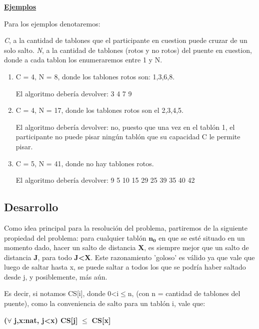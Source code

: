 \documentclass[10pt,a4paper]{article}
\begin{document}
\noindent \underline{\textbf{Ejemplos}}

\noindent Para los ejemplos denotaremos:

\textit{C}, a la cantidad de tablones que el participante en cuestion puede cruzar de un solo salto.\newline
\indent \textit{N}, a la cantidad de tablones (rotos y no rotos) del puente en cuestion, donde a cada tablon los enumeraremos entre 1 y N.

\begin{enumerate}[leftmargin=0.5cm]

\item C = 4, N = 8, donde los tablones rotos son: 1,3,6,8.

El algoritmo debería devolver: 3 4 7 9

\item C = 4, N = 17, donde los tablones rotos son el 2,3,4,5.

El algoritmo debería devolver: no, puesto que una vez en el tablón 1, el participante no puede pisar ningún tablón que su capacidad C le permite pisar.

\item  C = 5, N = 41, donde no hay tablones rotos.
                         
El algoritmo debería devolver: 9 5 10 15 29 25 39 35 40 42

\end{enumerate}
\newpage

\subsection{Desarrollo}

Como idea principal para la resolución del problema, partiremos de la siguiente propiedad del problema:
para cualquier tablón $\boldsymbol{n_0}$ en que se esté situado en un momento dado, hacer un salto de distancia \textbf{X}, es siempre mejor que un salto de distancia \textbf{J}, para todo \textbf{J\textless X}. Este razonamiento 'goloso' es válido ya que vale que luego de saltar hasta x, se puede saltar a todos los que se podría haber saltado desde j, y posiblemente, más aún.

Es decir, si notamos CS[i], donde 0\textless i$\leq$n, (con n = cantidad de tablones del puente), como la conveniencia de salto para un tablón i, vale que:

\textbf{(}$\boldsymbol\forall$ \textbf{j,x:nat, j\textless x) CS[j]} $\boldsymbol\leq$ \textbf{CS[x]}
\end{document}
